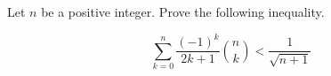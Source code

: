 Let $n$ be a positive integer. Prove the following inequality.

\[ \sum_{k=0}^n \dfrac{(-1)^k}{2k+1} \binom{n}{k} < \dfrac{1}{\sqrt{n+1}}\]
